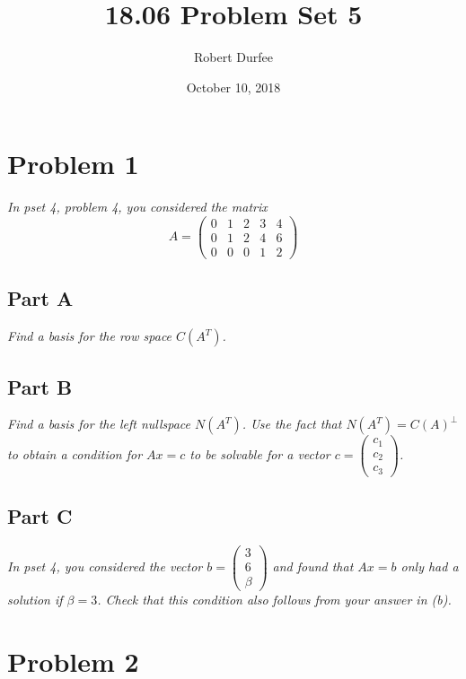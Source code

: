\documentclass{article}
\title{18.06 Problem Set 5}
\author{Robert Durfee}
\date{October 10, 2018}
\begin{document}
\maketitle

\section*{Problem 1}

\textit{In pset 4, problem 4, you considered the matrix}
$$ A = \begin{pmatrix}
    0 & 1 & 2 & 3 & 4 \\
    0 & 1 & 2 & 4 & 6 \\
    0 & 0 & 0 & 1 & 2
\end{pmatrix} $$

\subsection*{Part A}

\textit{Find a basis for the row space $C(A^T)$.}

\subsection*{Part B}

\textit{Find a basis for the left nullspace $N(A^T)$. Use the fact that
$N(A^T) = C(A)^\perp$ to obtain a condition for $Ax=c$ to be solvable for a
vector $c = \begin{pmatrix} c_1 \\ c_2 \\ c_3 \end{pmatrix}$.}

\subsection*{Part C}

\textit{In pset 4, you considered the vector $b = \begin{pmatrix} 3 \\ 6 \\
\beta \end{pmatrix}$ and found that $Ax=b$ only had a solution if $\beta =
3$. Check that this condition also follows from your answer in (b).}

\section*{Problem 2}
\end{document}
